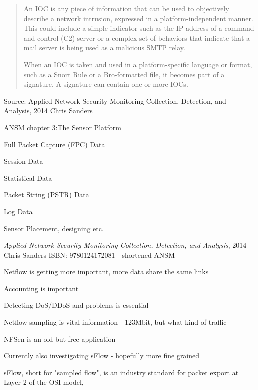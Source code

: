 \documentclass[Screen16to9,17pt]{foils}
\begin{document}
\begin{quote}
An IOC is any piece of information that can be used to objectively describe a
network intrusion, expressed in a platform-independent manner. This could include a simple indicator such as the IP address of a command and control (C2) server or a complex set of behaviors that indicate that a mail server is being used as a malicious SMTP relay.

When an IOC is taken and used in a platform-specific language or format, such as a Snort Rule or a Bro-formatted file, it becomes part of a signature. A signature can contain one or more IOCs.
\end{quote}

Source: Applied Network Security Monitoring Collection, Detection, and Analysis, 2014 Chris Sanders





\begin{list1}
\item ANSM chapter 3:The Sensor Platform
\begin{list2}
\item Full Packet Capture (FPC) Data
\item Session Data
\item Statistical Data
\item Packet String (PSTR) Data
\item Log Data
\item Sensor Placement, designing etc.
\end{list2}
\end{list1}
\emph{Applied Network Security Monitoring Collection, Detection, and Analysis}, 2014 Chris Sanders ISBN: 9780124172081 - shortened ANSM



\begin{slidelist}
\item Netflow is getting more important, more data share the same links
\item Accounting is important
\item Detecting DoS/DDoS and problems is essential
\item Netflow sampling is vital information - 123Mbit, but what kind of traffic
\item NFSen is an old but free application
\item Currently also investigating sFlow - hopefully more fine grained
\item sFlow, short for "sampled flow", is an industry standard for packet export at Layer 2 of the OSI model, \\
\end{slidelist}
\end{document}
